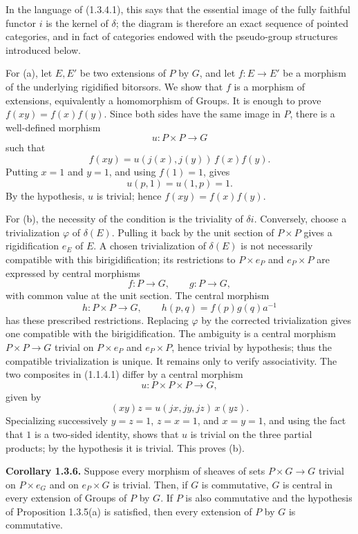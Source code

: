 \documentclass[11pt]{article}
\begin{document}
In the language of (1.3.4.1), this says that the essential image of the fully faithful functor \(i\) is the kernel of \(\delta\); the diagram is therefore an exact sequence of pointed categories, and in fact of categories endowed with the pseudo-group structures introduced below.

For (a), let \(E,E'\) be two extensions of \(P\) by \(G\), and let \(f:E\to E'\) be a morphism of the underlying rigidified bitorsors.  We show that \(f\) is a morphism of extensions, equivalently a homomorphism of Groups.  It is enough to prove \(f(xy)=f(x)f(y)\).  Since both sides have the same image in \(P\), there is a well-defined morphism
\[
  u:P\times P\longrightarrow G
\]
such that
\[
  f(xy)=u(j(x),j(y))\,f(x)f(y).
\]
Putting \(x=1\) and \(y=1\), and using \(f(1)=1\), gives
\[
  u(p,1)=u(1,p)=1.
\]
By the hypothesis, \(u\) is trivial; hence \(f(xy)=f(x)f(y)\).

For (b), the necessity of the condition is the triviality of \(\delta i\).  Conversely, choose a trivialization \(\varphi\) of \(\delta(E)\).  Pulling it back by the unit section of \(P\times P\) gives a rigidification \(e_E\) of \(E\).  A chosen trivialization of \(\delta(E)\) is not necessarily compatible with this birigidification; its restrictions to \(P\times e_P\) and \(e_P\times P\) are expressed by central morphisms
\[
  f:P\to G,\qquad g:P\to G,
\]
with common value at the unit section.  The central morphism
\[
  h:P\times P\to G,\qquad h(p,q)=f(p)g(q)a^{-1}
\]
has these prescribed restrictions.  Replacing \(\varphi\) by the corrected trivialization gives one compatible with the birigidification.  The ambiguity is a central morphism \(P\times P\to G\) trivial on \(P\times e_P\) and \(e_P\times P\), hence trivial by hypothesis; thus the compatible trivialization is unique.  It remains only to verify associativity.  The two composites in (1.1.4.1) differ by a central morphism
\[
  u:P\times P\times P\to G,
\]
given by
\[
  (xy)z=u(jx,jy,jz)\,x(yz).
\]
Specializing successively \(y=z=1\), \(z=x=1\), and \(x=y=1\), and using the fact that \(1\) is a two-sided identity, shows that \(u\) is trivial on the three partial products; by the hypothesis it is trivial.  This proves (b).

\textbf{Corollary 1.3.6.}  Suppose every morphism of sheaves of sets \(P\times G\to G\) trivial on \(P\times e_G\) and on \(e_P\times G\) is trivial.  Then, if \(G\) is commutative, \(G\) is central in every extension of Groups of \(P\) by \(G\).  If \(P\) is also commutative and the hypothesis of Proposition 1.3.5(a) is satisfied, then every extension of \(P\) by \(G\) is commutative.
\end{document}
